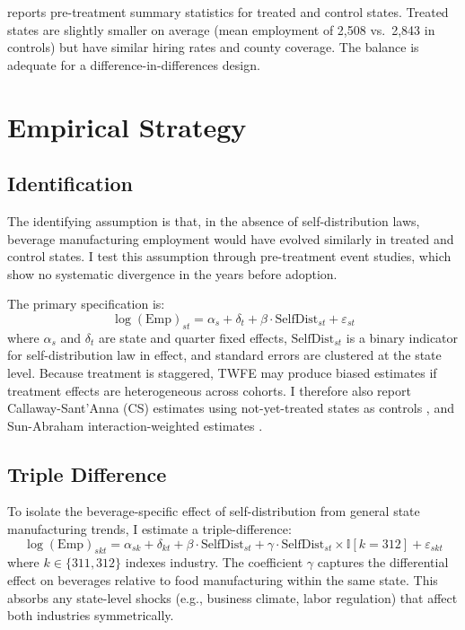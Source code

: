 \documentclass[12pt]{article}
\newcommand{\ind}{\mathbb{I}}
\begin{document}


 reports pre-treatment summary statistics for treated and control states. Treated states are slightly smaller on average (mean employment of 2,508 vs.\ 2,843 in controls) but have similar hiring rates and county coverage. The balance is adequate for a difference-in-differences design.

\section{Empirical Strategy}

\subsection{Identification}

The identifying assumption is that, in the absence of self-distribution laws, beverage manufacturing employment would have evolved similarly in treated and control states. I test this assumption through pre-treatment event studies, which show no systematic divergence in the years before adoption.

The primary specification is:
\begin{equation}
\log(\text{Emp})_{st} = \alpha_s + \delta_t + \beta \cdot \text{SelfDist}_{st} + \varepsilon_{st}
\label{eq:twfe}
\end{equation}
where $\alpha_s$ and $\delta_t$ are state and quarter fixed effects, $\text{SelfDist}_{st}$ is a binary indicator for self-distribution law in effect, and standard errors are clustered at the state level. Because treatment is staggered, TWFE may produce biased estimates if treatment effects are heterogeneous across cohorts. I therefore also report Callaway-Sant'Anna (CS) estimates using not-yet-treated states as controls \citep{callaway2021difference}, and Sun-Abraham interaction-weighted estimates \citep{sun2021estimating}.

\subsection{Triple Difference}

To isolate the beverage-specific effect of self-distribution from general state manufacturing trends, I estimate a triple-difference:
\begin{equation}
\log(\text{Emp})_{skt} = \alpha_{sk} + \delta_{kt} + \beta \cdot \text{SelfDist}_{st} + \gamma \cdot \text{SelfDist}_{st} \times \ind[k = 312] + \varepsilon_{skt}
\label{eq:ddd}
\end{equation}
where $k \in \{311, 312\}$ indexes industry. The coefficient $\gamma$ captures the differential effect on beverages relative to food manufacturing within the same state. This absorbs any state-level shocks (e.g., business climate, labor regulation) that affect both industries symmetrically.
\end{document}
